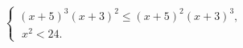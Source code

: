 \begin{ex}[type=ineq_system]
	\begin{condition}
		$\begin{cases} (x + 5)^3(x + 3)^2\leqslant(x + 5)^2(x + 3)^3 ,\\
			\;x^2<24.
		\end{cases}$
	\end{condition}
\end{ex}